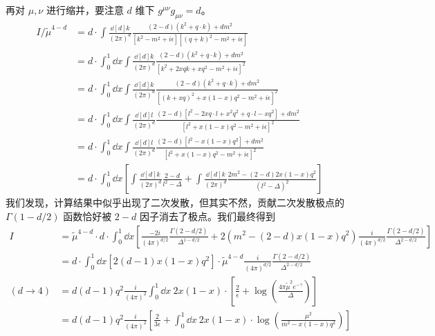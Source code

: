 再对 $\mu,\nu$ 进行缩并，要注意 $d$ 维下 $g^{\mu\nu}g_{\mu\nu}=d$。
\begin{equation}
\begin{aligned}
	I / \tilde{\mu}^{4-d} &= d \cdot\int \frac{\dd[d]{k}}{(2\pi)^d} \frac{(2-d)(k^2+q\cdot k) + d m^2}{[k^2-m^2+i\epsilon][(q+k)^2-m^2+i\epsilon]}\\
    &=d\cdot\int_0^1\dd x \int\frac{\dd[d]{k}}{(2\pi)^d} \frac{(2-d)(k^2+q\cdot k) + d m^2}{[k^2+2xqk+xq^2-m^2+i\epsilon]^2}\\
    &=d\cdot\int_0^1\dd x\int  \frac{\dd[d]{k}}{(2\pi)^d} \frac{(2-d)(k^2+q\cdot k)+d m^2}{[ (k+xq)^2 +x(1- x)q^2-m^2+i\epsilon ]^2}\\
    &=d\cdot\int_0^1\dd x\int  \frac{\dd[d]{l}}{(2\pi)^d} \frac{(2-d)\left[l^2 -2xq\cdot l +x^2q^2 +q\cdot l-x q^2\right]+d m^2}{[ l^2 +x(1- x)q^2-m^2+i\epsilon ]^2}\\
    &=d\cdot\int_0^1\dd x\int  \frac{\dd[d]{l}}{(2\pi)^d} \frac{(2-d)\left[l^2 -x(1-x)q^2\right]+d m^2}{[ l^2 +x(1- x)q^2-m^2+i\epsilon ]^2}\\
    &=d\cdot \int_0^1\dd x\left[\int\frac{\dd[d]{k}}{(2\pi)^d}\frac{2-d}{l^2-\Delta}+\int \frac{\dd[d]{k}}{(2\pi)^d}\frac{2m^2-(2-d)2x(1-x)q^2}{(l^2-\Delta)^2}\right]
\end{aligned}
\end{equation}
我们发现，计算结果中似乎出现了二次发散，但其实不然，贡献二次发散极点的 $\Gamma(1-d/2)$ 函数恰好被 $2-d$ 因子消去了极点。我们最终得到
\begin{equation}\label{qedlop_eq4}
\begin{aligned}
I&=\tilde{\mu}^{4-d}\cdot d\cdot\int_0^1\dd x \left[\frac{-2i}{(4\pi)^{d/2}}\frac{\Gamma(2-d/2)}{\Delta^{1-d/2}}+2(m^2-(2-d)x(1-x)q^2)\frac{i}{(4\pi)^{d/2}}\frac{\Gamma(2-d/2)}{\Delta^{2-d/2}}\right]\\
&= d \cdot \int_0^1\dd x [2(d-1)x(1-x)q^2] \cdot \tilde{\mu}^{4-d}\frac{i}{(4\pi)^{d/2}}\frac{\Gamma(2-d/2)}{\Delta^{2-d/2}}\\
(d\rightarrow 4)&=d(d-1)q^2 \frac{i}{(4\pi)^2}\int_0^1 \dd x\ 2x(1-x)\cdot\left[ \frac{2}{\epsilon}+\log\left(\frac{4\pi \tilde{\mu}^2 e^{-\gamma}}{\Delta}\right) \right]\\
&=d(d-1)q^2 \frac{i}{(4\pi)^2}\left[\frac{2}{3\epsilon}+\int_0^1 \dd x\ 2x(1-x)\cdot\log\left(\frac{\mu^2}{m^2-x(1-x)q^2}\right)\right]
\end{aligned}
\end{equation}
